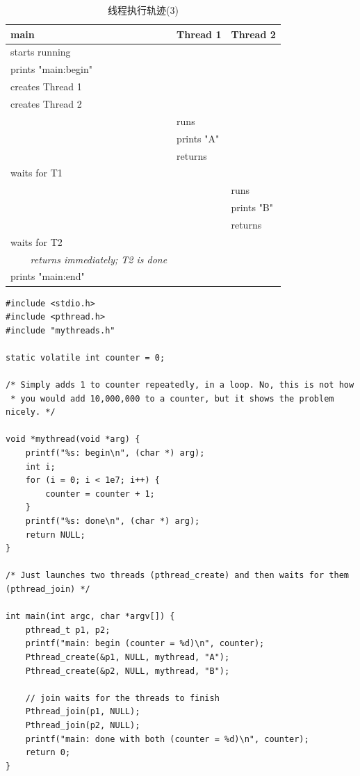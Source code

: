 \begin{table}[p]
\vspace{0.5cm}
{\scriptsize
\begin{tabular}{p{5cm} l l}
\textbf{main}&\textbf{Thread 1}&\textbf{Thread 2}\\ \midrule[1.1pt]
starts running &  & \\
prints "main:begin" &  & \\
creates Thread 1&  &  \\
creates Thread 2&  &  \\
  & runs &  \\
  & prints "A" &  \\
  & returns &  \\
waits for T1 &  &  \\
  &  & runs \\
  &  & prints "B" \\
  &  & returns \\
waits for T2 &  &  \\
\textsl{~~~~returns immediately; T2 is done} &  & \\
prints "main:end" &  &  \\
\end{tabular}}
\caption{\footnotesize 线程执行轨迹(3)}\color{black}\label{tab26-1}
\end{table}

\clearpage


\begin{lstlisting}
#include <stdio.h>
#include <pthread.h>
#include "mythreads.h"

static volatile int counter = 0;

/* Simply adds 1 to counter repeatedly, in a loop. No, this is not how 
 * you would add 10,000,000 to a counter, but it shows the problem nicely. */

void *mythread(void *arg) {
    printf("%s: begin\n", (char *) arg);
    int i;
    for (i = 0; i < 1e7; i++) {
        counter = counter + 1;
    }
    printf("%s: done\n", (char *) arg);
    return NULL;
}

/* Just launches two threads (pthread_create) and then waits for them (pthread_join) */

int main(int argc, char *argv[]) {
    pthread_t p1, p2;
    printf("main: begin (counter = %d)\n", counter);
    Pthread_create(&p1, NULL, mythread, "A");
    Pthread_create(&p2, NULL, mythread, "B");

    // join waits for the threads to finish
    Pthread_join(p1, NULL);
    Pthread_join(p2, NULL);
    printf("main: done with both (counter = %d)\n", counter);
    return 0;
}
\end{lstlisting}

